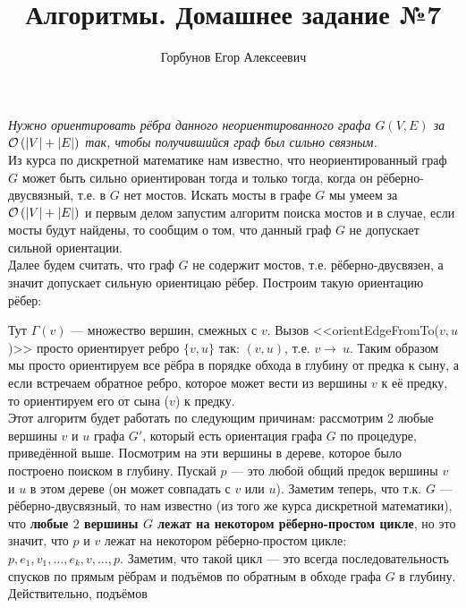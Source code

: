 
\title{Алгоритмы. Домашнее задание №7}
\author{Горбунов Егор Алексеевич}


\maketitle

\textit{Нужно ориентировать рёбра данного неориентированного графа $G(V,E)$ за $\mathcal{O}\left(|V|+|E|\right)$ так, чтобы получившийся граф был сильно связным.}\\
Из курса по дискретной математике нам известно, что неориентированный граф $G$ может быть сильно ориентирован тогда и
только тогда, когда он рёберно-двусвязный, т.е. в $G$ нет мостов. Искать мосты в графе $G$ мы умеем за 
$\mathcal{O}\left(|V|+|E|\right)$ и первым делом запустим алгоритм поиска мостов и в случае, если мосты будут найдены, то сообщим о том, что данный граф $G$ не допускает сильной ориентации.\\
Далее будем считать, что граф $G$ не содержит мостов, т.е. рёберно-двусвязен, а значит допускает сильную ориентицаю
рёбер. Построим такую ориентацию рёбер:
\begin{algorithmic}
		\EndIf
	\EndFor
\EndProcedure
\end{algorithmic}
Тут $\Gamma{(v)}$ --- множество вершин, смежных с $v$. 
Вызов <<orientEdgeFromTo($v,u$)>> просто ориентирует ребро $\lbrace v, u \rbrace$ так: $(v,u)$, т.е. $v\rightarrow~u$.
Таким образом мы просто ориентируем все рёбра в порядке обхода в глубину от предка к сыну, а если встречаем обратное ребро, которое может вести из вершины $v$ к её предку, то ориентируем его от сына ($v$) к предку.\\
Этот алгоритм будет работать по следующим причинам: рассмотрим 2 любые вершины $v$ и $u$ графа $G'$, который 
есть ориентация графа $G$ по процедуре, приведённой выше. Посмотрим на эти вершины в дереве, которое было построено поиском в глубину. Пускай $p$ --- это любой общий предок вершины $v$ и $u$ в этом дереве (он  может совпадать с $v$ или $u$).
Заметим теперь, что т.к. $G$ --- рёберно-двусвязный, то нам известно (из того же курса дискретной математики), 
что \textbf{любые $2$ вершины $G$ лежат на некотором рёберно-простом цикле}, но это значит, 
что $p$ и $v$ лежат на некотором рёберно-простом цикле: $p,e_1,v_1,\ldots,e_k,v,\ldots,p$. Заметим, что такой цикл --- это
всегда последовательность спусков по прямым рёбрам и подъёмов по обратным в обходе графа $G$ в глубину. Действительно, подъёмов
